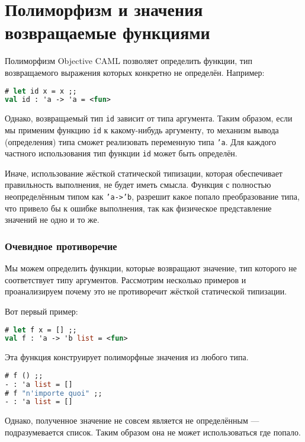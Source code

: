 \section{Полиморфизм и значения возвращаемые функциями}
\label{sec:polymorphism_and_return_values_of_functions}

Полиморфизм Objective CAML позволяет определить функции, тип возвращаемого
выражения которых конкретно не определён. Например:

\begin{lstlisting}[language=OCaml]
# let id x = x ;;
val id : 'a -> 'a = <fun>
\end{lstlisting}

Однако, возвращаемый тип \texttt{id} зависит от типа аргумента. Таким образом,
если мы применим функцию \texttt{id} к какому-нибудь аргументу, то механизм
вывода (определения) типа сможет реализовать переменную типа \texttt{'a}. Для
каждого частного использования тип функции \texttt{id} может быть определён.

Иначе, использование жёсткой статической типизации, которая обеспечивает
правильность выполнения, не будет иметь смысла. Функция с полностью
неопределённым типом как \texttt{'a->'b}, разрешит какое попало преобразование
типа, что привело бы к ошибке выполнения, так как физическое представление
значений не одно и то же.

\subsubsection{Очевидное противоречие}

Мы можем определить функции, которые возвращают значение, тип которого не
соответствует типу аргументов. Рассмотрим несколько примеров и проанализируем
почему это не противоречит жёсткой статической типизации.

Вот первый пример:

\begin{lstlisting}[language=OCaml]
# let f x = [] ;;
val f : 'a -> 'b list = <fun>
\end{lstlisting}

Эта функция конструирует полиморфные значения из любого типа.

\begin{lstlisting}[language=OCaml]
# f () ;;
- : 'a list = []
# f "n'importe quoi" ;;
- : 'a list = []
\end{lstlisting}

Однако, полученное значение не совсем является не определённым ---
подразумевается список. Таким образом она не может использоваться где попало.

